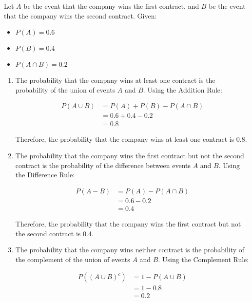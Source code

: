 \begin{solution}
    Let $A$ be the event that the company wins the first contract, and $B$ be the event that the company wins the second contract. Given:
    \begin{itemize}
        \item $P(A) = 0.6$
        \item $P(B) = 0.4$
        \item $P(A \cap B) = 0.2$
    \end{itemize}
    
    \begin{enumerate}[label=(\alph*)]
        \item The probability that the company wins at least one contract is the probability of the union of events $A$ and $B$. Using the Addition Rule:
        
        \begin{align*}
            P(A \cup B) &= P(A) + P(B) - P(A \cap B) \\
                        &= 0.6 + 0.4 - 0.2 \\
                        &= 0.8
        \end{align*}
        
        Therefore, the probability that the company wins at least one contract is 0.8.
        
        \item The probability that the company wins the first contract but not the second contract is the probability of the difference between events $A$ and $B$. Using the Difference Rule:
        
        \begin{align*}
            P(A - B) &= P(A) - P(A \cap B) \\
                    &= 0.6 - 0.2 \\
                    &= 0.4
        \end{align*}
        
        Therefore, the probability that the company wins the first contract but not the second contract is 0.4.
        
        \item The probability that the company wins neither contract is the probability of the complement of the union of events $A$ and $B$. Using the Complement Rule:
        
        \begin{align*}
            P((A \cup B)^c) &= 1 - P(A \cup B) \\
                                    &= 1 - 0.8 \\
                                    &= 0.2
        \end{align*}
        

\end{enumerate}
\end{solution}

